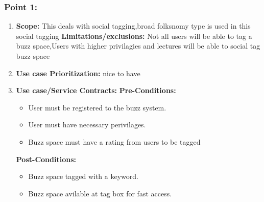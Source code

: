 \documentclass[11pt]{article}
\begin{document}
\subsubsection{Point 1:} 
\begin{enumerate}
\item 
\textbf{Scope:}
This deals with social tagging,broad folksnomy type is used in this social tagging
\newline
\textbf{Limitations/exclusions:} 
Not all users will be able to tag a buzz space,Users with higher privilagies and lectures will be able to social tag buzz space

\item 
\textbf{Use case Prioritization:} nice to have

\item 
\textbf{Use case/Service Contracts:} 
\newline
\textbf{Pre-Conditions: }
\begin{itemize}
\item User must be registered to the buzz system.
\item User must have necessary perivilages.
\item Buzz space must have a rating from users to be tagged
\end{itemize}
 

\textbf{Post-Conditions: }
\begin{itemize}
\item Buzz space tagged with a keyword.
\item Buzz space avilable at tag box for fast access.
\end{itemize}
\end{enumerate}
\end{document}
